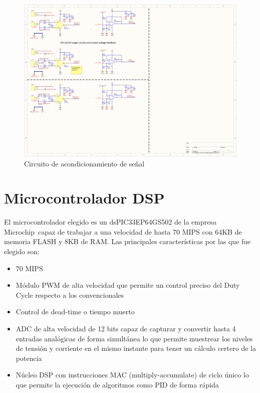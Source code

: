 \documentclass[12pt]{report}
\begin{document}
\begin{figure}
	\centering
	\includegraphics[width=\textwidth,height=\textheight,keepaspectratio]{sch_control_feedback} 
	\caption{Circuito de acondicionamiento de señal}
	\label{control:feedback}
\end{figure}

\section{Microcontrolador DSP}

El microcontrolador elegido es un dsPIC33EP64GS502 de la empresa Microchip\textregistered \ capaz de trabajar a una velocidad de hasta 70 MIPS con 64KB de memoria FLASH y 8KB de RAM. Las principales características por las que fue elegido son:

\begin{itemize}
	\item 70 MIPS
	\item Módulo PWM de alta velocidad que permite un control preciso del Duty Cycle respecto a los convencionales
	\item Control de dead-time o tiempo muerto
	\item ADC de alta velocidad de 12 bits capaz de capturar y convertir hasta 4 entradas analógicas de forma simultánea lo que permite muestrear los niveles de tensión y corriente en el mismo instante para tener un cálculo certero de la potencia
	\item Núcleo DSP con instrucciones MAC (multiply-accumulate) de ciclo único lo que permite la ejecución de algoritmos como PID de forma rápida
\end{itemize} 
\end{document}
